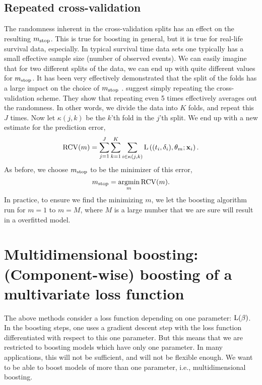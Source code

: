 \subsection{Repeated cross-validation}
The randomness inherent in the cross-validation splits has an effect on the resulting $m_{\text{stop}}$. This is true for boosting in general, but it is true for real-life survival data, especially. In typical survival time data sets one typically has a small effective sample size (number of observed events). We can easily imagine that for two different splits of the data, we can end up with quite different values for $m_{\text{stop}}$.
It has been very effectively demonstrated that the split of the folds has a large impact on the choice of $m_{\text{stop}}$ \citep{seibold}. \citet{seibold} suggest simply repeating the cross-validation scheme. They show that repeating even 5 times effectively averages out the randomness.  In other words, we divide the data into $K$ folds, and repeat this $J$ times. Now let $\kappa(j, k)$ be the $k$'th fold in the $j$'th split. We end up with a new estimate for the prediction error,
\begin{equation}
    \operatorname{RCV}(m)=\sum_{j=1}^J\sum_{k=1}^K\sum_{i\in\kappa(j,k)}\operatorname{L}\left((t_i,\delta_i),\theta_m;\mathbf{x}_i\right).
\end{equation}
As before, we choose $m_{\text{stop}}$ to be the minimizer of this error,
\begin{equation}
    m_{\text{stop}}=\operatorname*{argmin}_{m}\operatorname{RCV}(m).
\end{equation}
In practice, to ensure we find the minimizing $m$, we let the boosting algorithm run for $m=1$ to $m=M$, where $M$ is a large number that we are sure will result in a overfitted model.

\section{Multidimensional boosting: (Component-wise) boosting of a multivariate loss function}
The above methods consider a loss function depending on one parameter: $\operatorname{L}(\beta)$. In the boosting steps, one uses a gradient descent step with the loss function differentiated with respect to this one parameter. But this means that we are restricted to boosting models which have only one parameter. In many applications, this will not be sufficient, and will not be flexible enough. We want to be able to boost models of more than one parameter, i.e., multidimensional boosting.

